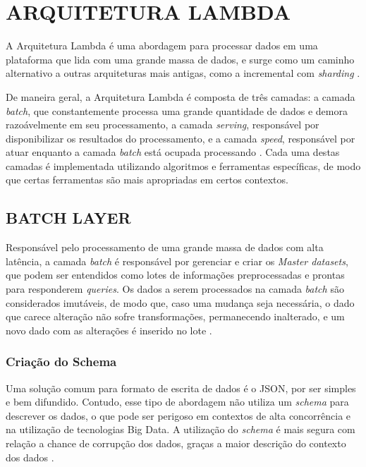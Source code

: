 \chapter[ARQUITETURA LAMBDA]{ARQUITETURA LAMBDA}

A Arquitetura Lambda é uma abordagem para processar dados em uma plataforma
que lida com uma grande massa de dados, e surge como um caminho alternativo
a outras arquiteturas mais antigas, como a incremental com \textit{sharding}
\cite{marz2015}.

De maneira geral, a Arquitetura Lambda é composta de três camadas: a camada
\textit{batch}, que constantemente processa uma grande quantidade de dados e
demora razoávelmente em seu processamento, a camada \textit{serving},
responsável por disponibilizar os resultados do processamento, e a camada
\textit{speed}, responsável por atuar enquanto a camada \textit{batch} está
ocupada processando \cite{marz2015}. Cada uma destas camadas é implementada
utilizando algoritmos e ferramentas específicas, de modo que certas ferramentas
são mais apropriadas em certos contextos.

\section{BATCH LAYER}

Responsável pelo processamento de uma grande massa de dados com alta latência,
a camada \textit{batch} é responsável por gerenciar e criar os
\textit{Master datasets}, que podem ser entendidos como lotes de informações
preprocessadas e prontas para responderem \textit{queries}. Os dados a serem
processados na camada \textit{batch} são considerados imutáveis, de modo que,
caso uma mudança seja necessária, o dado que carece alteração não sofre
transformações, permanecendo inalterado, e um novo dado com as alterações é
inserido no lote \cite{marz2015}.

\subsection{Criação do Schema}

Uma solução comum para formato de escrita de dados é o JSON, por ser simples e
bem difundido. Contudo, esse tipo de abordagem não utiliza um \textit{schema}
para descrever os dados, o que pode ser perigoso em contextos de alta
concorrência e na utilização de tecnologias Big Data. A utilização do
\textit{schema} é mais segura com relação a chance de corrupção dos dados,
graças a maior descrição do contexto dos dados \cite{marz2015}.


